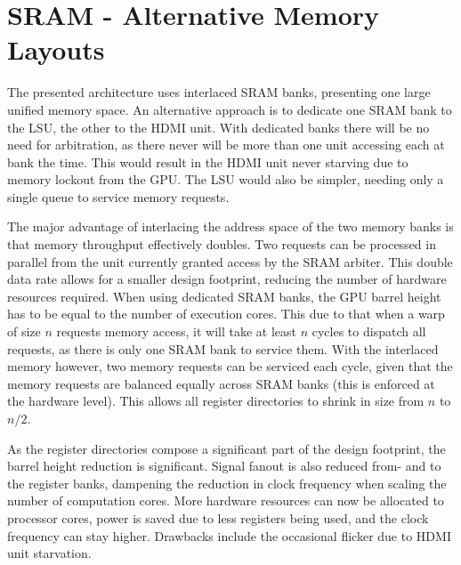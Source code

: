 \section{SRAM - Alternative Memory Layouts}

The presented architecture uses interlaced SRAM banks, presenting one large unified memory space.
An alternative approach is to dedicate one SRAM bank to the LSU, the other to the HDMI unit.
With dedicated banks there will be no need for arbitration, as there never will be more than one unit accessing each at bank the time.
This would result in the HDMI unit never starving due to memory lockout from the GPU.
The LSU would also be simpler, needing only a single queue to service memory requests.

The major advantage of interlacing the address space of the two memory banks is that memory throughput effectively doubles.
Two requests can be processed in parallel from the unit currently granted access by the SRAM arbiter.
This double data rate allows for a smaller design footprint, reducing the number of hardware resources required.
When using dedicated SRAM banks, the GPU barrel height has to be equal to the number of execution cores.
This due to that when a warp of size $n$ requests memory access, it will take at least $n$ cycles to dispatch all requests, as there is only one SRAM bank to service them.
With the interlaced memory however, two memory requests can be serviced each cycle, given that the memory requests are balanced equally across SRAM banks (this is enforced at the hardware level).
This allows all register directories to shrink in size from $n$ to $n/2$.

As the register directories compose a significant part of the design footprint, the barrel height reduction is significant.
Signal fanout is also reduced from- and to the register banks, dampening the reduction in clock frequency when scaling the number of computation cores.
More hardware resources can now be allocated to processor cores, power is saved due to less registers being used, and the clock frequency can stay higher.
Drawbacks include the occasional flicker due to HDMI unit starvation.
